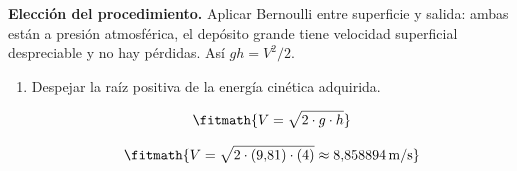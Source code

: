 \noindent\textbf{Elección del procedimiento.} Aplicar Bernoulli entre superficie y salida: ambas están a presión atmosférica, el depósito grande tiene velocidad superficial despreciable y no hay pérdidas. Así $gh=V^2/2$.

\begin{enumerate}

\item Despejar la raíz positiva de la energía cinética adquirida.

\[\fitmath{V=\sqrt{2\cdot g\cdot h}}\]

\[\fitmath{V=\sqrt{2\cdot (9{,}81)\cdot (4)}\approx 8{,}858894\,\mathrm{m/s}}\]

\end{enumerate}
